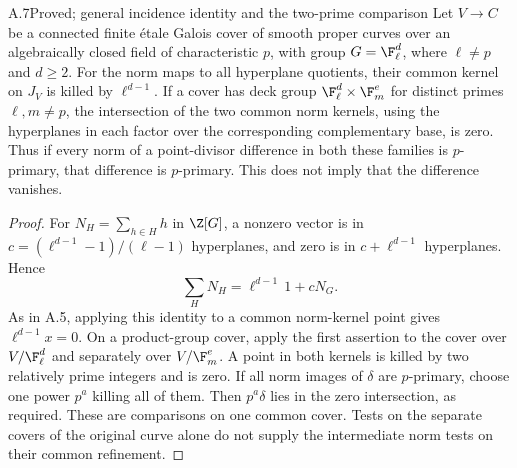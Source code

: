 \begin{claim}{A.7}{Proved; general incidence identity and the two-prime comparison}
Let $V\to C$ be a connected finite \'etale Galois cover of smooth
proper curves over an algebraically closed field of characteristic
$p$, with group $G=\F_\ell^d$, where $\ell\ne p$ and $d\geq2$.
For the norm maps to all hyperplane quotients, their common kernel
on $J_V$ is killed by $\ell^{d-1}$. If a cover has deck group
$\F_\ell^d\times\F_m^e$ for distinct primes $\ell,m\ne p$,
the intersection of the two common norm kernels, using the
hyperplanes in each factor over the corresponding complementary
base, is zero. Thus if every norm of a point-divisor difference in
both these families is $p$-primary, that difference is $p$-primary.
This does not imply that the difference vanishes.
\end{claim}
\begin{proof}
For $N_H=\sum_{h\in H}h$ in $\Z[G]$, a nonzero vector is in
$c=(\ell^{d-1}-1)/(\ell-1)$ hyperplanes, and zero is in
$c+\ell^{d-1}$ hyperplanes. Hence
\[
 \sum_HN_H=\ell^{d-1}\,1+cN_G.
\]
As in A.5, applying this identity to a common norm-kernel point
gives $\ell^{d-1}x=0$. On a product-group cover, apply the first
assertion to the cover over $V/\F_\ell^d$ and separately over
$V/\F_m^e$. A point in both kernels is killed by two relatively
prime integers and is zero. If all norm images of $\delta$ are
$p$-primary, choose one power $p^a$ killing all of them.
Then $p^a\delta$ lies in the zero intersection, as required.
These are comparisons on one common cover. Tests on the separate
covers of the original curve alone do not supply the intermediate
norm tests on their common refinement.
\end{proof}

